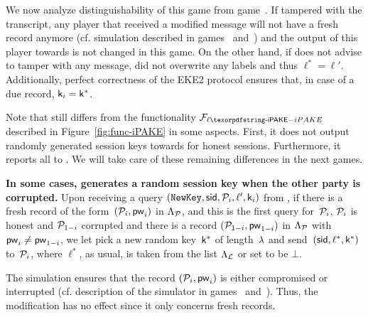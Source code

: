 \begin{games}
We now analyze distinguishability of this game from game~\previousgame.
If \Env tampered with the transcript, any player that received a modified message will not have a fresh record anymore (cf. simulation described in games~ and~) and the output of this player towards \Env is not changed in this game.
On the other hand, if \Env does not advise \AdvA to tamper with any message, \Func did not overwrite any labels and thus $\ell^*=\ell'$. Additionally, perfect correctness of the EKE2 protocol ensures that, in case of a due record, $\mathsf{k}_{i}=\mathsf{k}^*$.

Note that \Func still differs from the functionality $\FliPAKE$ described in Figure~\ref{fig:func-iPAKE} in some aspects. First, it does not output randomly generated session keys towards \Env for honest sessions. Furthermore, it reports all \passwords to \Sim. We will take care of these remaining differences in the next games.



\textbf{In some cases, \Func generates a random session key when the other party is corrupted.}
Upon receiving a \NewKey query $(\texttt{NewKey},\mathsf{sid},\mathcal{P}_{i},\ell',\mathsf{k}_{i})$ from \Sim, if there is a fresh record of the form~$(\mathcal{P}_{i},\mathsf{pw}_{i})$ in $\Lambda_{\mathcal{P}}$, and this is the first \NewKey query for~$\mathcal{P}_{i}$, $\mathcal{P}_{i}$ is honest and $\mathcal{P}_{1-i}$ corrupted and there is a record $(\mathcal{P}_{1-i},\mathsf{pw}_{1-i})$ in $\Lambda_{\mathcal{P}}$ with $\mathsf{pw}_{i}\neq\mathsf{pw}_{1-i}$, we let \Func pick a new random key~$\mathsf{k}^*$ of length~$\lambda$ and send~$(\mathsf{sid},\ell^*,\mathsf{k}^*)$ to~$\mathcal{P}_{i}$, where $\ell^*$, as usual, is taken from the list $\Lambda_{\mathcal{L}}$ or set to be $\bot$. 

The simulation ensures that the record $(\mathcal{P}_{i},\mathsf{pw}_{i})$ is either compromised or interrupted (cf. description of the simulator in games~ and~). Thus, the modification has no effect since it only concerns fresh records. 


\end{games}
